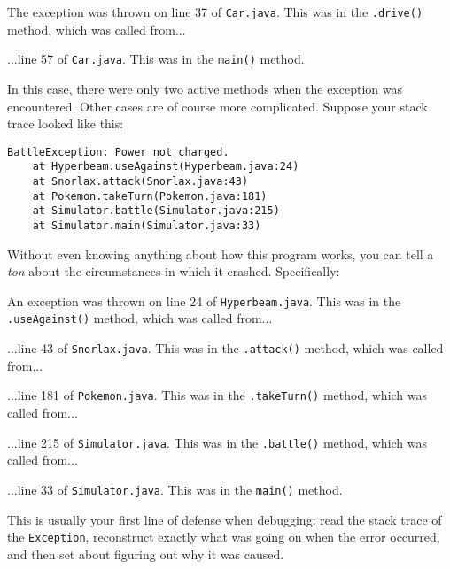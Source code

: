 \begin{compactenum}
\item The exception was thrown on line 37 of \texttt{Car.java}. This was in
the \texttt{.drive()} method, which was called from...
\item ...line 57 of \texttt{Car.java}. This was in the \texttt{main()} method.
\end{compactenum}

In this case, there were only two active methods when the exception was
encountered. Other cases are of course more complicated. Suppose your stack
trace looked like this:

\begin{Verbatim}[fontsize=\small,samepage=true,frame=none]
BattleException: Power not charged.
    at Hyperbeam.useAgainst(Hyperbeam.java:24)
    at Snorlax.attack(Snorlax.java:43)
    at Pokemon.takeTurn(Pokemon.java:181)
    at Simulator.battle(Simulator.java:215)
    at Simulator.main(Simulator.java:33)
\end{Verbatim}

Without even knowing anything about how this program works, you can tell a
\textit{ton} about the circumstances in which it crashed. Specifically:

\begin{compactenum}

\item An exception was thrown on line 24 of \texttt{Hyperbeam.java}. This was
in the \texttt{.useAgainst()} method, which was called from...

\item ...line 43 of \texttt{Snorlax.java}. This was in the \texttt{.attack()}
method, which was called from...

\item ...line 181 of \texttt{Pokemon.java}. This was in the
\texttt{.takeTurn()} method, which was called from...

\item ...line 215 of \texttt{Simulator.java}. This was in the
\texttt{.battle()} method, which was called from...

\item ...line 33 of \texttt{Simulator.java}. This was in the \texttt{main()}
method.

\end{compactenum}

This is usually your first line of defense when debugging: read the stack
trace of the \texttt{Exception}, reconstruct exactly what was going on when
the error occurred, and then set about figuring out why it was caused.

